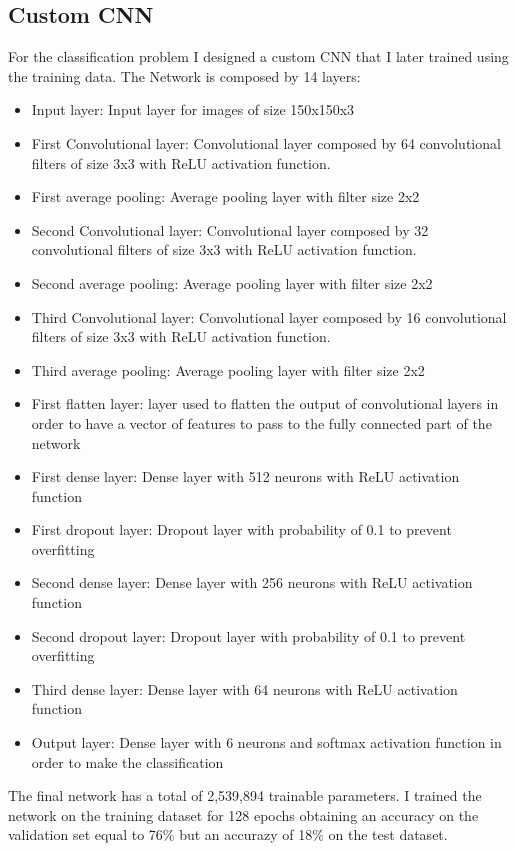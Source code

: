 \documentclass[12pt,journal,compsoc]{IEEEtran}
\begin{document}
\subsection{Custom CNN}
For the classification problem I designed a custom CNN that I later trained using the training data. The Network is composed by 14 layers:
\begin{itemize}
	\item Input layer: Input layer for images of size 150x150x3
	\item First Convolutional layer: Convolutional layer composed by 64 convolutional filters of size 3x3 with ReLU activation function.
	\item First average pooling: Average pooling layer with filter size 2x2
	\item Second Convolutional layer: Convolutional layer composed by 32 convolutional filters of size 3x3 with ReLU activation function.
	\item Second average pooling: Average pooling layer with filter size 2x2
	\item Third Convolutional layer: Convolutional layer composed by 16 convolutional filters of size 3x3 with ReLU activation function.
	\item Third average pooling: Average pooling layer with filter size 2x2
	\item First flatten layer: layer used to flatten the output of convolutional layers in order to have a vector of features to pass to the fully connected part of the network
	\item First dense layer: Dense layer with 512 neurons with ReLU activation function
	\item First dropout layer: Dropout layer with probability of 0.1 to prevent overfitting
	\item Second dense layer: Dense layer with 256 neurons with ReLU activation function
	\item Second dropout layer: Dropout layer with probability of 0.1 to prevent overfitting
	\item Third dense layer: Dense layer with 64 neurons with ReLU activation function
	\item Output layer: Dense layer with 6 neurons and softmax activation function in order to make the classification
\end{itemize}
The final network has a total of 2,539,894 trainable parameters.
I trained the network on the training dataset for 128 epochs obtaining an accuracy on the validation set equal to 76\% but an accurazy of 18\% on the test dataset.
\end{document}
